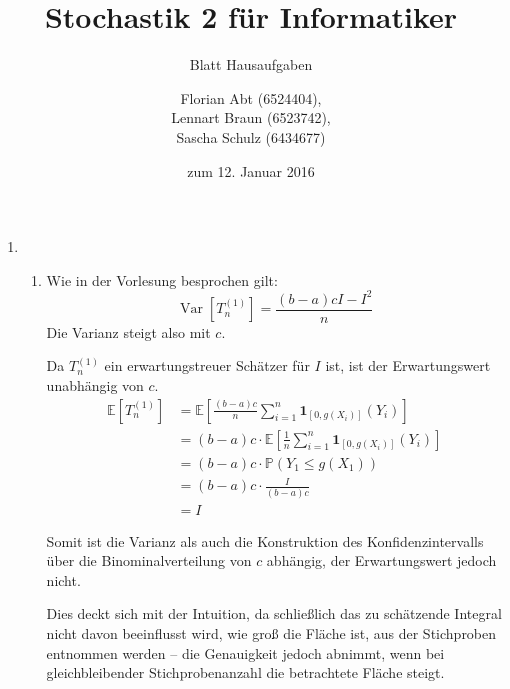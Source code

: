 \documentclass[a4paper]{scrartcl}
\title{Stochastik 2 für Informatiker}
\subtitle{Blatt {\blattnr} Hausaufgaben}
\author{
    Florian Abt (6524404), \\
    Lennart Braun (6523742), \\
    Sascha Schulz (6434677)
}
\date{zum 12. Januar 2016}
\newcommand{\prob}{\mathbb{P}}
\newcommand{\e}{\mathbb{E}}
\newcommand{\var}{\operatorname{Var}}
\def \blattnr {11}
\begin{document}
\maketitle

\begin{enumerate}[label=\bfseries \blattnr.\arabic*]
  \item %
    \begin{enumerate}
     \item %
         Wie in der Vorlesung besprochen gilt:
         \begin{equation*}
             \var\left[T_n^{(1)}\right] = \frac{(b-a)cI - I^2}{n}
         \end{equation*}
         Die Varianz steigt also mit $c$.


         Da $T_n^{(1)}$ ein erwartungstreuer Schätzer für $I$ ist, ist der
         Erwartungswert unabhängig von $c$.
         \begin{equation*}
             \begin{split}
                 \e\left[T_n^{(1)}\right]
                 &= \e \left[ \frac{(b-a)c}{n} \sum_{i=1}^n \mathbf{1}_{[0,g(X_i)]}(Y_i) \right] \\
                 &= (b-a)c \cdot \e \left[ \frac{1}{n} \sum_{i=1}^n \mathbf{1}_{[0,g(X_i)]}(Y_i) \right] \\
                 &= (b-a)c \cdot \prob(Y_1 \leq g(X_1)) \\
                 &= (b-a)c \cdot \frac{I}{(b-a)c} \\
                 &= I
             \end{split}
         \end{equation*}

     Somit ist die Varianz als auch die Konstruktion des Konfidenzintervalls 
     über die Binominalverteilung von $c$ abhängig, 
     der Erwartungswert jedoch nicht. 

     Dies deckt sich mit der Intuition, da 
     schließlich das zu schätzende Integral nicht davon beeinflusst wird, 
     wie groß die Fläche ist, aus der Stichproben entnommen werden -- die 
     Genauigkeit jedoch abnimmt, wenn bei gleichbleibender Stichprobenanzahl
     die betrachtete Fläche steigt.


\end{enumerate}
\end{enumerate}
\end{document}
